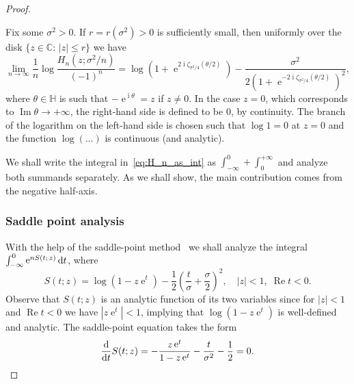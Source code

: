 \documentclass[10pt]{amsart}
\theoremstyle{definition}\newtheorem{defi}[theo]{Definition}\newtheorem{rema}[theo]{Remark}\newtheorem{exam}[theo]{Example}\newtheorem{exem}[theo]{Example}\newtheorem{nota}[theo]{Notation}
\DeclareMathOperator{\Ree}{Re}
\DeclareMathOperator{\Imm}{Im}
\DeclareMathOperator{\eee}{e}
\DeclareMathOperator{\ii}{i}
\newcommand{\bH}{\mathbb{H}}
\newcommand{\C}{\mathbb{C}}
\newcommand*\dint{\text{\normalfont d}}
\begin{document}
\begin{proof}
\begin{prop}\label{prop:log_asympt_H_n_small_z}
Fix some $\sigma^2>0$. If $r=r(\sigma^2)>0$ is sufficiently small, then uniformly over the disk $\{z\in \C:\, |z|\leq r\}$ we have
\[
\lim_{n\to\infty}
\frac 1n \log \frac {H_n\left(z;\sigma^2/n\right)}{(-1)^n} =
\log \left(1+\eee^{2\ii \zeta_{\sigma^2/4}(\theta/2)}\right) - \frac{\sigma^2}{2\left(1+ \eee^{-2 \ii \zeta_{\sigma^2/4}(\theta/2)}\right)^2},
\]
where $\theta\in \bH$ is such that $-\eee^{\ii \theta} = z$ if $z\neq 0$. In the case $z=0$, which corresponds to $\Imm \theta \to +\infty$, the right-hand side is defined to be $0$, by continuity. The branch of the logarithm on the left-hand side is chosen such that $\log 1=0$ at $z=0$ and the function $\log(\ldots)$ is continuous (and analytic).
\end{prop}



We shall write the integral in~\eqref{eq:H_n_as_int} as $\int_{-\infty}^0 + \int_{0}^{+\infty}$ and analyze both summands separately. As we shall show, the main contribution comes from the negative half-axis.


\subsubsection*{Saddle point analysis}
With the help of the saddle-point method~\cite[\S 45.4, p.~423]{sidorov_fedoryuk_shabunin_book} we shall analyze the integral $\int_{-\infty}^0 \eee^{n S(t;\,z)} \dint t$, where
\begin{equation}\label{eq:S_def}
S(t;z) = \log (1-z\eee^t) - \frac 12 \left(\frac{t}{\sigma} + \frac \sigma 2\right)^2,
\quad |z|<1, \; \Ree t < 0.
\end{equation}
Observe that $S(t;z)$ is an analytic function of its two variables since for $|z|< 1$ and $\Ree t < 0$ we have $|z\eee^t| < 1$, implying that $\log (1-z \eee^t)$ is well-defined and analytic. The saddle-point equation takes the form
\begin{equation}\label{eq:saddle_point}
\frac{\dint}{\dint t} S(t; z) = - \frac{z\eee^t}{1 - z \eee^{t}} - \frac {t}{\sigma^2} - \frac 12 = 0.
\end{equation}


\end{proof}
\end{document}
